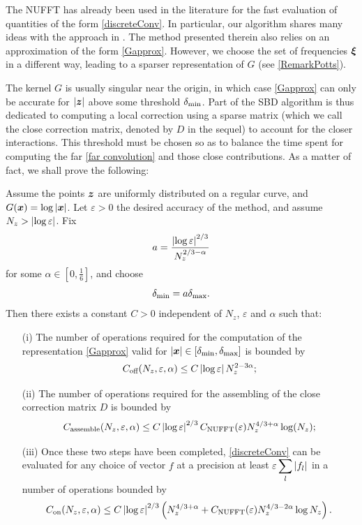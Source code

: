 \documentclass[smallextended]{svjour3}
\begin{document}
The NUFFT has already been used in the literature for the fast evaluation of quantities of the form \eqref{discreteConv}. In particular, our algorithm shares many ideas with the approach in \cite{potts2004fast}. The method presented therein also relies on an approximation of the form \eqref{Gapprox}. However, we choose the set of frequencies $\boldsymbol{\xi}$ in a different way, leading to a sparser representation of $G$ (see \autoref{RemarkPotts}). 

The kernel $G$ is usually singular near the origin, in which case \eqref{Gapprox} can only be accurate for $|\boldsymbol{z}|$ above some threshold $\delta_{\min}$. Part of the SBD algorithm is thus dedicated to computing a local correction using a sparse matrix (which we call the close correction matrix, denoted by $D$ in the sequel) to account for the closer interactions. This threshold must be chosen so as to balance the time spent for computing the far \eqref{far convolution} and those close contributions. As a matter of fact, we shall prove the following:

\begin{theorem} Assume the points $\boldsymbol{z}$ are uniformly distributed on a regular curve, and $G(\boldsymbol{x}) = \log \left\lvert \boldsymbol{x} \right\rvert$. Let $\varepsilon > 0$ the desired accuracy of the method, and assume $N_z > \left\lvert \log{\varepsilon} \right\rvert$. Fix 
	\[a =\dfrac{\left\lvert \log\varepsilon \right\rvert^{2/3}}{N_z^{2/3 - \alpha}}\]
	for some $\alpha \in \left[0,\frac{1}{6}\right]$, and choose 
	\[\delta_{\min} = a \delta_{\max}.\] 
	Then there exists a constant $C>0$ independent of $N_z$, $\varepsilon$ and $\alpha$ such that:
	\label{The:GlobalComplexity}
	\begin{itemize}
		\item[(i)] The number of operations required for the computation of the representation \eqref{Gapprox} valid for $\left\lvert \boldsymbol{x} \right\rvert \in [\delta_{\min},\delta_{\max}]$  is bounded by 
		      \[ C_{\textup{off}}(N_z,\varepsilon,\alpha) \leq C \left\lvert \log \varepsilon \right\rvert N_z^{2 - 3\alpha};\]
		\item[(ii)] The number of operations required for the assembling of the close correction matrix $D$ is bounded by
		      \[C_{\textup{assemble}}(N_z,\varepsilon,\alpha)\leq C \left\lvert \log\varepsilon \right\rvert^{2/3}  C_{\textup{NUFFT}}(\varepsilon) N_z^{4/3 + \alpha}\log(N_z);\]
		\item[(iii)] Once these two steps have been completed, \eqref{discreteConv} can be evaluated for any choice of vector $f$ at a precision at least $\varepsilon \displaystyle\sum_l \left\lvert f_l \right\rvert$ in a number of operations bounded by
		      \[C_{\textup{on}}(N_z,\varepsilon,\alpha) \leq C \left\lvert \log\varepsilon \right\rvert^{2/3} \left(  N_z ^{4/3 + \alpha} + C_{\textup{NUFFT}}(\varepsilon)N_z^{4/3 - 2\alpha}\log N_z \right).\] 
	\end{itemize} 
\end{theorem}
\end{document}
